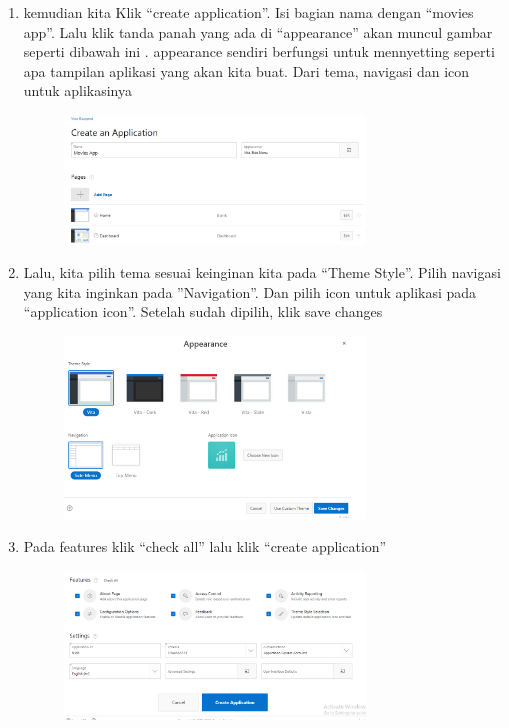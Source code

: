 \documentclass{article}
\begin{document}
\begin{enumerate}
\begin{figure}[h]
            \end{figure}
    \newpage \item kemudian kita Klik “create application”. Isi bagian nama dengan “movies app”. Lalu klik tanda panah yang ada di “appearance” akan muncul gambar seperti dibawah ini . appearance sendiri berfungsi untuk mennyetting seperti apa tampilan aplikasi yang akan kita buat. Dari tema, navigasi dan icon untuk aplikasinya
    \begin{figure}[h]
            \centerline{\includegraphics[width=8cm]{image/13.png}}
            \end{figure}
    \item Lalu, kita pilih tema sesuai keinginan kita pada “Theme Style”. Pilih navigasi yang kita inginkan pada ”Navigation”. Dan pilih icon untuk aplikasi pada “application icon”. Setelah sudah dipilih, klik save changes
    \begin{figure}[h]
            \centerline{\includegraphics[width=8cm]{image/14.PNG}}
            \end{figure}
    \newpage \item Pada features klik “check all” lalu klik “create application”
    \begin{figure}[h]
            \centerline{\includegraphics[width=8cm]{image/15.png}}

\end{figure}
\end{enumerate}
\end{document}
